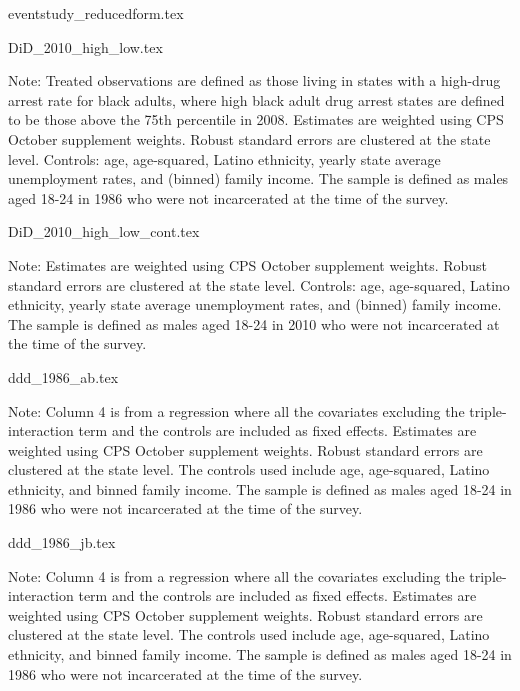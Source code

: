 \documentclass{article}
\begin{document}
  \clearpage

  {eventstudy_reducedform.tex}

  \clearpage


  {DiD_2010_high_low.tex}
  \begin{footnotesize}
    \noindent Note: Treated observations are defined as those living in states with a high-drug arrest rate for black adults, where high black adult drug arrest states are defined to be those above the 75th percentile in 2008. Estimates are weighted using CPS October supplement weights. Robust standard errors are clustered at the state level. Controls: age, age-squared, Latino ethnicity, yearly state average unemployment rates, and (binned) family income. The sample is defined as males aged 18-24 in 1986 who were not incarcerated at the time of the survey.
  \end{footnotesize}

  {DiD_2010_high_low_cont.tex}
  \begin{footnotesize}
    \noindent Note: Estimates are weighted using CPS October supplement weights. Robust standard errors are clustered at the state level. Controls: age, age-squared, Latino ethnicity, yearly state average unemployment rates, and (binned) family income. The sample is defined as males aged 18-24 in 2010 who were not incarcerated at the time of the survey.
  \end{footnotesize}
  \clearpage

  {ddd_1986_ab.tex}
\begin{footnotesize}
  \noindent Note: Column 4 is from a regression where all the covariates excluding the triple-interaction term and the controls are included as fixed effects. Estimates are weighted using CPS October supplement weights. Robust standard errors are clustered at the state level. The controls used include age, age-squared, Latino ethnicity, and binned family income. The sample is defined as males aged 18-24 in 1986 who were not incarcerated at the time of the survey. 
\end{footnotesize}
\clearpage

{ddd_1986_jb.tex}
\begin{footnotesize}
  \noindent Note: Column 4 is from a regression where all the covariates excluding the triple-interaction term and the controls are included as fixed effects. Estimates are weighted using CPS October supplement weights. Robust standard errors are clustered at the state level. The controls used include age, age-squared, Latino ethnicity, and binned family income. The sample is defined as males aged 18-24 in 1986 who were not incarcerated at the time of the survey. 
\end{footnotesize}
\end{document}
